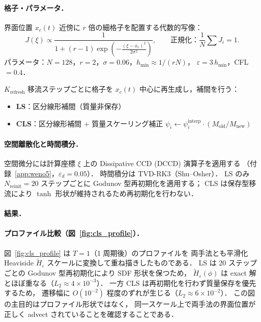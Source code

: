 \paragraph{格子・パラメータ．}

界面位置 $x_c(t)$ 近傍に $r$ 倍の細格子を配置する代数的写像：
\begin{equation}
  J(\xi) \propto \frac{1}{1 + (r-1)\exp\!\left(-\frac{(\xi - x_c)^2}{2\sigma^2}\right)},
  \qquad
  \text{正規化：}\frac{1}{N}\sum J_i = 1.
\end{equation}
パラメータ：$N=128$，$r=2$，$\sigma=0.06$，$h_{\min} \approx 1/(rN)$，
$\varepsilon = 3\,h_{\min}$，CFL $= 0.4$．

$K_{\mathrm{refresh}}$ 移流ステップごとに格子を $x_c(t)$ 中心に再生成し，補間を行う：
\begin{itemize}
  \item \textbf{LS}：区分線形補間（質量非保存）
  \item \textbf{CLS}：区分線形補間 $+$ 質量スケーリング補正
    $\psi_i \leftarrow \psi_i^{\mathrm{interp}} \cdot (M_{\mathrm{old}}/M_{\mathrm{new}})$
\end{itemize}

\paragraph{空間離散化と時間積分．}

空間微分には計算座標 $\xi$ 上の Dissipative CCD (DCCD) 演算子を適用する
（付録~\ref{app:weno5}，$\varepsilon_d = 0.05$）．
時間積分は TVD-RK3（Shu--Osher）．
LS のみ $N_{\mathrm{reinit}} = 20$ ステップごとに Godunov 型再初期化を適用する；
CLS は保存型移流により $\tanh$ 形状が維持されるため再初期化を行わない．

\paragraph{結果．}

\paragraph{プロファイル比較（図~\ref{fig:cls_profile}）．}
図~\ref{fig:cls_profile} は $T=1$（1 周期後）のプロファイルを
両手法とも平滑化 Heaviside $\tilde{H}_\varepsilon$ スケールに変換して重ね描きしたものである．
LS は 20 ステップごとの Godunov 型再初期化により SDF 形状を保つため，
$\tilde{H}_\varepsilon(\phi)$ は exact 解とほぼ重なる（$L_2 \approx 4\times10^{-3}$）．
一方 CLS は再初期化を行わず質量保存を優先するため，
遷移幅に $O(10^{-2})$ 程度のずれが生じる（$L_2 \approx 6\times10^{-2}$）．
この図の主目的はプロファイル形状ではなく，
同一スケール上で両手法の界面位置が正しく advect されていることを確認することである．

